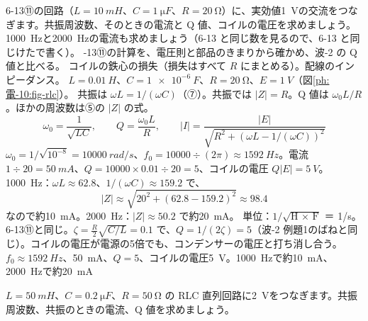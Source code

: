 \begin{phreidai}
\label{ph:電-10:ex6}6-13⑪の回路（$L=\qty{10}{mH}$、$C=\qty{1}{\micro F}$、$R=\qty{20}{\ohm}$）に、実効値\qty{1}{V}の交流をつなぎます。共振周波数、そのときの電流と Q 値、コイルの電圧を求めましょう。\qty{1000}{Hz}と\qty{2000}{Hz}の電流も求めましょう（6-13 と同じ数を見るので、6-13 と同じけたで書く）。
-13⑪の計算を、電圧則と部品のきまりから確かめ、波-2 の Q 値と比べる。
\phmushi
コイルの鉄心の損失（損失はすべて $R$ にまとめる）。配線のインピーダンス。
\phzu
$L=\qty{0.01}{H}$、$C=\qty{1e-6}{F}$、$R=\qty{20}{\ohm}$、$E=\qty{1}{V}$（図\ref{ph:電-10:fig-rlc}）。
\phriyu
共振は $\omega L=1/(\omega C)$（⑦）。共振では $\lvert Z\rvert=R$。Q 値は $\omega_0L/R$。ほかの周波数は⑤の $\lvert Z\rvert$ の式。
\phtateru
\[ \omega_0=\frac{1}{\sqrt{LC}},\qquad Q=\frac{\omega_0L}{R},\qquad \lvert I\rvert=\frac{\lvert E\rvert}{\sqrt{R^2+(\omega L-1/(\omega C))^2}} \]
\phtoku
$\omega_0=1/\sqrt{10^{-8}}=\qty{10000}{rad/s}$、$f_0=10000\div(2\pi)\approx\qty{1592}{Hz}$。電流 $1\div20=\qty{50}{mA}$、$Q=10000\times0.01\div20=5$、コイルの電圧 $Q\lvert E\rvert=\qty{5}{V}$。\\
\qty{1000}{Hz}：$\omega L\approx62.8$、$1/(\omega C)\approx159.2$ で、
\[ \lvert Z\rvert\approx\sqrt{20^2+(62.8-159.2)^2}\approx98.4 \]
なので約\qty{10}{mA}。\qty{2000}{Hz}：$\lvert Z\rvert\approx50.2$ で約\qty{20}{mA}。
\phtashikame
単位：$1/\sqrt{\text{H × F}}$ ＝ 1/s。6-13⑪と同じ。$\zeta=\tfrac{R}{2}\sqrt{C/L}=0.1$ で、$Q=1/(2\zeta)=5$（波-2 例題1のばねと同じ）。コイルの電圧が電源の5倍でも、コンデンサーの電圧と打ち消し合う。
\kotae $f_0\approx\qty{1592}{Hz}$、\qty{50}{mA}、$Q=5$、コイルの電圧\qty{5}{V}。\qty{1000}{Hz}で約\qty{10}{mA}、\qty{2000}{Hz}で約\qty{20}{mA}
\end{phreidai}
\begin{jibun}
$L=\qty{50}{mH}$、$C=\qty{0.2}{\micro F}$、$R=\qty{50}{\ohm}$ の RLC 直列回路に\qty{2}{V}をつなぎます。共振周波数、共振のときの電流、Q 値を求めましょう。
\end{jibun}

